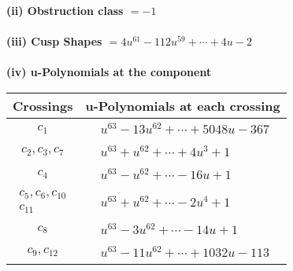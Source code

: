 \documentclass[1p]{elsarticle_modified}
\theoremstyle{definition}
\begin{document}
\flushleft \textbf{(ii) Obstruction class $= -1$}\\~\\
\flushleft \textbf{(iii) Cusp Shapes $= 4 u^{61}-112 u^{59}+\cdots+4 u-2$}\\~\\
\newpage\renewcommand{\arraystretch}{1}
\flushleft \textbf{(iv) u-Polynomials at the component}\newline \\
\begin{tabular}{m{50pt}|m{274pt}}
Crossings & \hspace{64pt}u-Polynomials at each crossing \\
\hline $$\begin{aligned}c_{1}\end{aligned}$$&$\begin{aligned}
&u^{63}-13 u^{62}+\cdots+5048 u-367
\end{aligned}$\\
\hline $$\begin{aligned}c_{2},c_{3},c_{7}\end{aligned}$$&$\begin{aligned}
&u^{63}+u^{62}+\cdots+4 u^3+1
\end{aligned}$\\
\hline $$\begin{aligned}c_{4}\end{aligned}$$&$\begin{aligned}
&u^{63}- u^{62}+\cdots-16 u+1
\end{aligned}$\\
\hline $$\begin{aligned}c_{5},c_{6},c_{10}\\c_{11}\end{aligned}$$&$\begin{aligned}
&u^{63}+u^{62}+\cdots-2 u^4+1
\end{aligned}$\\
\hline $$\begin{aligned}c_{8}\end{aligned}$$&$\begin{aligned}
&u^{63}-3 u^{62}+\cdots-14 u+1
\end{aligned}$\\
\hline $$\begin{aligned}c_{9},c_{12}\end{aligned}$$&$\begin{aligned}
&u^{63}-11 u^{62}+\cdots+1032 u-113
\end{aligned}$\\
\hline
\end{tabular}\\~\\
\end{document}

